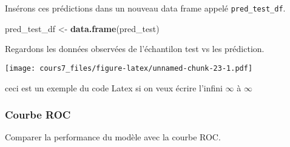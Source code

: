 \documentclass[
]{article}
\newenvironment{Shaded}{\begin{snugshade}}{\end{snugshade}}
\newcommand{\AttributeTok}[1]{\textcolor[rgb]{0.13,0.29,0.53}{#1}}
\newcommand{\FunctionTok}[1]{\textcolor[rgb]{0.13,0.29,0.53}{\textbf{#1}}}
\newcommand{\NormalTok}[1]{#1}
\newcommand{\OtherTok}[1]{\textcolor[rgb]{0.56,0.35,0.01}{#1}}
\newcommand{\SpecialCharTok}[1]{\textcolor[rgb]{0.81,0.36,0.00}{\textbf{#1}}}
\newcommand{\StringTok}[1]{\textcolor[rgb]{0.31,0.60,0.02}{#1}}
\begin{document}
Insérons ces prédictions dans un nouveau data frame appelé
\texttt{pred\_test\_df}.

\begin{Shaded}
\begin{Highlighting}[]
\NormalTok{pred\_test\_df }\OtherTok{\textless{}{-}} \FunctionTok{data.frame}\NormalTok{(pred\_test)}
\end{Highlighting}
\end{Shaded}

Regardons les données observées de l'échantilon test vs les prédiction.

\begin{Shaded}
\end{Shaded}

\texttt{[image: cours7\_files/figure-latex/unnamed-chunk-23-1.pdf]}

ceci est un exemple du code Latex si on veux écrire l'infini \(\infty\)
à \(\infty\)

\hypertarget{courbe-roc}{%
\subsubsection{Courbe ROC}\label{courbe-roc}}

Comparer la performance du modèle avec la courbe ROC.
\end{document}
